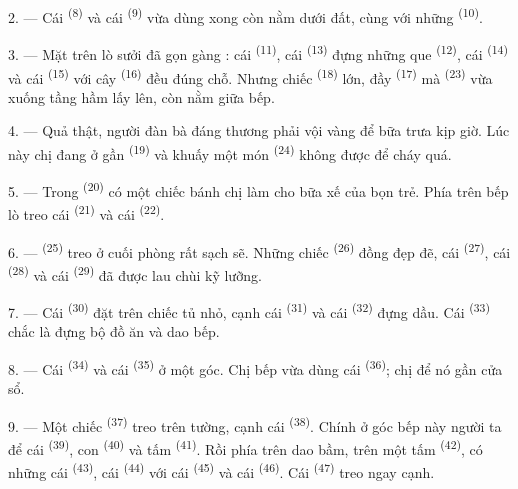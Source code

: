 2. --- Cái  \textsuperscript{(8)} và cái 
\textsuperscript{(9)} vừa dùng xong còn nằm dưới đất, cùng với những 
\textsuperscript{(10)}.

3. --- Mặt trên lò sưởi đã gọn gàng : cái  \textsuperscript{(11)}, cái
 \textsuperscript{(13)} đựng những que 
\textsuperscript{(12)}, cái  \textsuperscript{(14)} và cái  \textsuperscript{(15)} với cây  \textsuperscript{(16)} đều đúng chỗ.
Nhưng chiếc  \textsuperscript{(18)} lớn, đầy 
\textsuperscript{(17)} mà  \textsuperscript{(23)} vừa xuống tầng hầm lấy
lên, còn nằm giữa bếp.

4. --- Quả thật, người đàn bà đáng thương phải vội vàng để bữa trưa kịp giờ. Lúc này chị
đang ở gần  \textsuperscript{(19)} và khuấy một món 
\textsuperscript{(24)} không được để cháy quá.

5. --- Trong  \textsuperscript{(20)} có một chiếc bánh chị làm cho bữa
xế của bọn trẻ. Phía trên bếp lò treo cái  \textsuperscript{(21)} và cái
 \textsuperscript{(22)}.

\VUsaut{4.0mm}
\VUsaut{3.0mm}

6. ---  \textsuperscript{(25)} treo ở cuối phòng rất sạch sẽ.
Những chiếc  \textsuperscript{(26)} đồng đẹp đẽ, cái 
\textsuperscript{(27)}, cái  \textsuperscript{(28)} và cái 
\textsuperscript{(29)} đã được lau chùi kỹ lưỡng.

7. --- Cái  \textsuperscript{(30)} đặt trên chiếc tủ nhỏ, cạnh cái
 \textsuperscript{(31)} và cái  \textsuperscript{(32)} đựng
dầu. Cái  \textsuperscript{(33)} chắc là đựng bộ đồ ăn và dao bếp.

8. --- Cái  \textsuperscript{(34)} và cái 
\textsuperscript{(35)} ở một góc. Chị bếp vừa dùng cái 
\textsuperscript{(36)}; chị để nó gần cửa sổ.

9. --- Một chiếc  \textsuperscript{(37)} treo trên tường, cạnh cái
 \textsuperscript{(38)}. Chính ở góc bếp này người ta để cái  \textsuperscript{(39)}, con  \textsuperscript{(40)} và tấm
 \textsuperscript{(41)}. Rồi phía trên dao bầm, trên một tấm 
\textsuperscript{(42)}, có những cái  \textsuperscript{(43)}, cái  \textsuperscript{(44)} với cái  \textsuperscript{(45)} và cái
 \textsuperscript{(46)}. Cái  \textsuperscript{(47)} treo
ngay cạnh.

